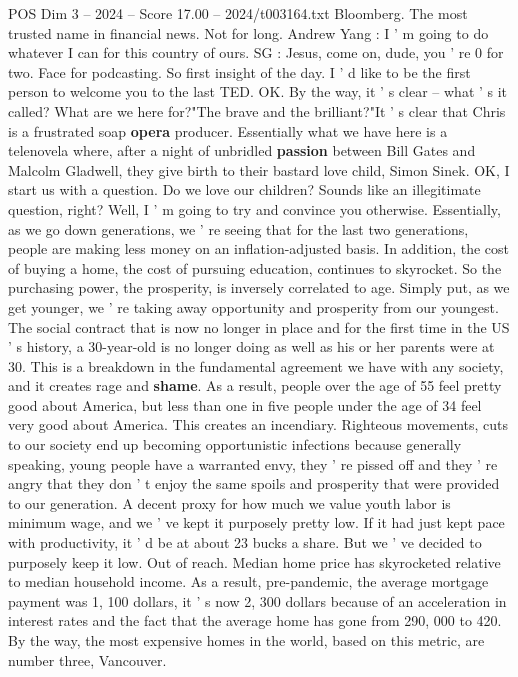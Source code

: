 \begin{textsample}{POS Dim 3 – 2024 – Score 17.00 – 2024/t003164.txt}
Bloomberg.
The most trusted name in financial news.
Not for long.
Andrew Yang : I ' m going to do whatever I can for this country of ours.
SG : Jesus, come on, dude, you ' re 0 for two.
Face for podcasting.
So first insight of the day.
I ' d like to be the first person to welcome you to the last TED.
OK.
By the way, it ' s clear -- what ' s it called?
What are we here for?"The brave and the brilliant?"It ' s clear that Chris is a frustrated soap \textbf{opera} producer.
Essentially what we have here is a telenovela where, after a night of unbridled \textbf{passion} between Bill Gates and Malcolm Gladwell, they give birth to their bastard love child, Simon Sinek.
OK, I start us with a question.
Do we love our children?
Sounds like an illegitimate question, right?
Well, I ' m going to try and convince you otherwise.
Essentially, as we go down generations, we ' re seeing that for the last two generations, people are making less money on an inflation-adjusted basis.
In addition, the cost of buying a home, the cost of pursuing education, continues to skyrocket.
So the purchasing power, the prosperity, is inversely correlated to age.
Simply put, as we get younger, we ' re taking away opportunity and prosperity from our youngest.
The social contract that is now no longer in place and for the first time in the US ' s history, a 30-year-old is no longer doing as well as his or her parents were at 30.
This is a breakdown in the fundamental agreement we have with any society, and it creates rage and \textbf{shame}.
As a result, people over the age of 55 feel pretty good about America, but less than one in five people under the age of 34 feel very good about America.
This creates an incendiary.
Righteous movements, cuts to our society end up becoming opportunistic infections because generally speaking, young people have a warranted envy, they ' re pissed off and they ' re angry that they don ' t enjoy the same spoils and prosperity that were provided to our generation.
A decent proxy for how much we value youth labor is minimum wage, and we ' ve kept it purposely pretty low.
If it had just kept pace with productivity, it ' d be at about 23 bucks a share.
But we ' ve decided to purposely keep it low.
Out of reach.
Median home price has skyrocketed relative to median household income.
As a result, pre-pandemic, the average mortgage payment was 1, 100 dollars, it ' s now 2, 300 dollars because of an acceleration in interest rates and the fact that the average home has gone from 290, 000 to 420.
By the way, the most expensive homes in the world, based on this metric, are number three, Vancouver.

\end{textsample}
